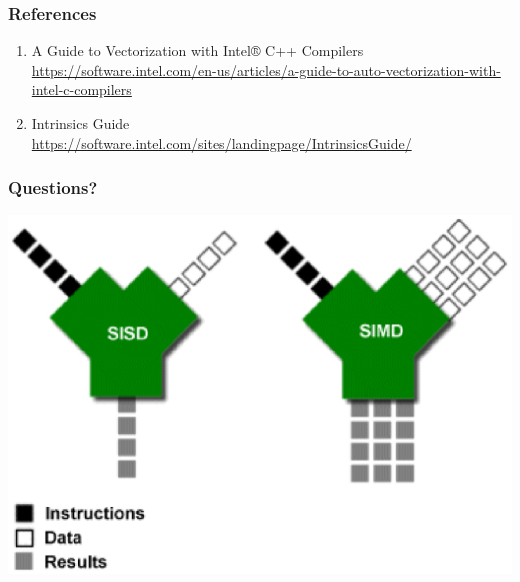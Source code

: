 \documentclass{beamer}
\begin{document}
\begin{frame} 
 \frametitle{References}
 \begin{enumerate}
  \item A Guide to Vectorization with Intel® C++ Compilers \\ \small{\textcolor{gray}{\url{https://software.intel.com/en-us/articles/a-guide-to-auto-vectorization-with-intel-c-compilers}}}
  \item \Intel Intrinsics Guide \\ \small{\textcolor{gray}{\url{https://software.intel.com/sites/landingpage/IntrinsicsGuide/}}}
 \end{enumerate}

 

\end{frame}

\begin{frame} 
 \frametitle{Questions?}
 \includegraphics[width=1\textwidth]{SIMD}
\end{frame}
\end{document}
